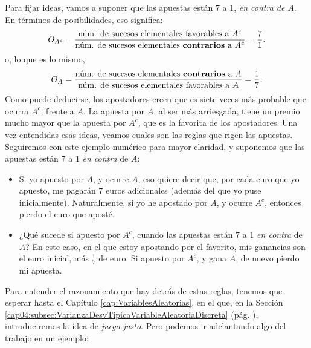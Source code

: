 Para fijar ideas, vamos a suponer que las apuestas están $7$ a $1$, {\em en contra de $A$}. En términos de posibilidades, eso significa:
\[
O_{A^c}=
\dfrac{\mbox{núm. de sucesos elementales favorables a $A^c$}}
{\mbox{núm. de sucesos elementales {\bf contrarios} a $A^c$}}=\dfrac{7}{1}.
\]
o, lo que es lo mismo,
\[
O_{A}=
\dfrac{\mbox{núm. de sucesos elementales {\bf contrarios} a $A$}}
{\mbox{núm. de sucesos elementales favorables a $A$}}
=\dfrac{1}{7}.
\]
Como puede deducirse, los apostadores creen que es siete veces más probable que ocurra $A^c$, frente a $A$. La apuesta por $A$, al ser más arriesgada, tiene un premio mucho mayor que la apuesta por $A^c$, que es la favorita de los apostadores. Una vez entendidas esas ideas, veamos cuales son las reglas que rigen las apuestas. Seguiremos con este ejemplo numérico para mayor claridad, y suponemos que las apuestas están $7$ a $1$ {\em en contra} de $A$:
\begin{itemize}
  \item Si yo apuesto por $A$, y ocurre $A$, eso quiere decir que, por cada euro que yo apuesto, me pagarán $7$ euros adicionales (además del que yo puse inicialmente). Naturalmente, si yo he apostado por $A$, y ocurre $A^c$, entonces pierdo el euro que aposté.
  \item  ¿Qué sucede si apuesto por $A^c$, cuando las apuestas están $7$ a $1$ {\em en contra} de  $A$? En este caso, en el que estoy apostando por el favorito, mis ganancias son el euro inicial, más $\frac{1}{7}$ de euro. Si apuesto por $A^c$, y gana $A$, de nuevo pierdo mi apuesta.
\end{itemize}
Para entender el razonamiento que hay detrás de estas reglas, tenemos que esperar hasta el Capítulo \ref{cap:VariablesAleatorias}, en el que, en la Sección \ref{cap04:subsec:VarianzaDesvTipicaVariableAleatoriaDiscreta} (pág. \pageref{cap04:subsec:VarianzaDesvTipicaVariableAleatoriaDiscreta}), introduciremos la idea de {\em juego justo}. Pero podemos ir adelantando algo del trabajo en un ejemplo:
